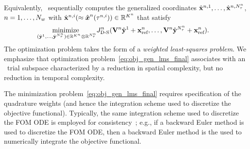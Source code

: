 Equivalently, \methodAcronym\ sequentially computes the generalized
	coordinates
	$\hat{\mathbf{x}}^{n,1},\ldots,\hat{\mathbf{x}}^{n,N_{\tau}^{n}}$,
	$n=1,\ldots,N_w$ 
with $\hat{\mathbf{x}}^{n,i}(\approx
	\hat{ \boldsymbol x}^{n}(\tau^{n,i}))\in\mathbb{R}^{K^{n}}$
	that satisfy
\begin{equation}\label{eq:obj_gen_lms_final}
\begin{split}
	&
	\underset{(\hat{\mathbf{y}}^{1},\ldots,\hat{\mathbf{y}}^{N_{\tau}^{n}})\in\mathbb{R}^{K^{n}}\otimes \mathbb{R}^{N_{\tau}^{n}}}{\text{minimize } }
J^{n}_{\text{D-S}} (\mathbf {V}^{n} \hat{\mathbf{y}}^{1} + \mathbf{x}_\text{ref}^{n},\ldots,\mathbf {V}^{n} \hat{\mathbf{y}}^{N_{\tau}^{n}} + \mathbf{x}_\text{ref}^{n}). 
\end{split}
\end{equation}
The optimization problem takes the form of a \textit{weighted least-squares
	problem}. 
We emphasize that optimization problem~\eqref{eq:obj_gen_lms_final} associates
	with an \spatialAcronym\ trial subspace characterized by a reduction in
	spatial complexity, but no reduction in temporal complexity.
 
The minimization problem~\eqref{eq:obj_gen_lms_final} requires specification of the quadrature weights (and hence the integration scheme used to discretize 
the objective functional). Typically, the same integration scheme used to discretize the FOM ODE is employed for consistency~\cite{colloc_review}; e.g., if a  
backward Euler method is used to discretize the FOM ODE, then a backward Euler method is the used to numerically integrate the objective functional.

